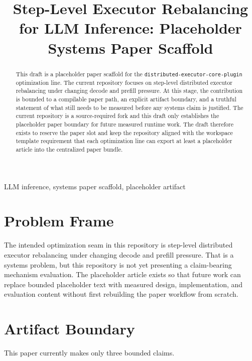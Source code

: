 \documentclass[conference]{IEEEtran}
\begin{document}
\title{Step-Level Executor Rebalancing for LLM Inference: Placeholder Systems Paper Scaffold}

\author{}

\maketitle

\begin{abstract}
This draft is a placeholder paper scaffold for the \texttt{distributed-executor-core-plugin} optimization line. The current repository focuses on step-level distributed executor rebalancing under changing decode and prefill pressure. At this stage, the contribution is bounded to a compilable paper path, an explicit artifact boundary, and a truthful statement of what still needs to be measured before any systems claim is justified. The current repository is a source-required fork and this draft only establishes the placeholder paper boundary for future measured runtime work. The draft therefore exists to reserve the paper slot and keep the repository aligned with the workspace template requirement that each optimization line can export at least a placeholder article into the centralized paper bundle.
\end{abstract}

\begin{IEEEkeywords}
LLM inference, systems paper scaffold, placeholder artifact
\end{IEEEkeywords}

\section{Problem Frame}

The intended optimization seam in this repository is step-level distributed executor rebalancing under changing decode and prefill pressure. That is a systems problem, but this repository is not yet presenting a claim-bearing mechanism evaluation. The placeholder article exists so that future work can replace bounded placeholder text with measured design, implementation, and evaluation content without first rebuilding the paper workflow from scratch.

\section{Artifact Boundary}

This paper currently makes only three bounded claims.
\end{document}
